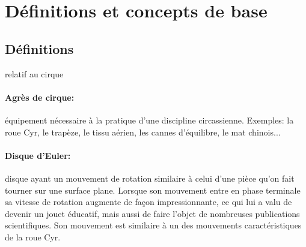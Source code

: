 \section{Définitions et concepts de base}  %



\subsection{Définitions}
 relatif au cirque 
\paragraph{Agrès de cirque:} équipement nécessaire à la pratique d'une discipline circassienne. Exemples: la roue Cyr, le trapèze, le tissu aérien, les cannes d'équilibre, le mat chinois...
\paragraph{Disque d'Euler:} disque ayant un mouvement de rotation similaire à celui d'une pièce qu'on fait tourner sur une surface plane. Lorsque son mouvement entre en phase terminale sa vitesse de rotation augmente de façon impressionnante, ce qui lui a valu de devenir un jouet éducatif, mais aussi de faire l'objet de nombreuses publications scientifiques. Son mouvement est similaire à un des mouvements caractéristiques de la roue Cyr.


